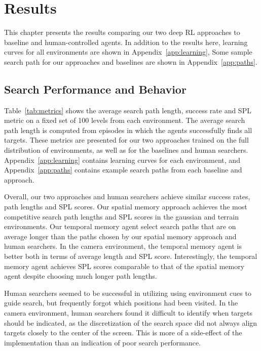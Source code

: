 \chapter{Results}
\label{cha:results}

This chapter presents the results comparing our two deep RL approaches to baseline and human-controlled agents.
In addition to the results here, learning curves for all environments are shown in Appendix~\ref{app:learning},
Some sample search path for our approaches and baselines are shown in Appendix~\ref{app:paths}.


\section{Search Performance and Behavior}

Table~\ref{tab:metrics} shows the average search path length, success rate and SPL metric on a fixed set of 100 levels from each environment.
The average search path length is computed from episodes in which the agents successfully finds all targets.
These metrics are presented for our two approaches trained on the full distribution of environments, as well as for the baselines and human searchers.
Appendix~\ref{app:learning} contains learning curves for each environment, and Appendix~\ref{app:paths} contains example search paths from each baseline and approach. 

Overall, our two approaches and human searchers achieve similar success rates, path lengths and SPL scores.
Our spatial memory approach achieves the most competitive search path lengths and SPL scores in the gaussian and terrain environments.
Our temporal memory agent select search paths that are on average longer than the paths chosen by our spatial memory approach and human searchers.
In the camera environment, the temporal memory agent is better both in terms of average length and SPL score.
Interestingly, the temporal memory agent achieves SPL scores comparable to that of the spatial memory agent despite choosing much longer path lengths.

Human searchers seemed to be successful in utilizing using environment cues to guide search, but frequently forgot which positions had been visited.
In the camera environment, human searchers found it difficult to identify when targets should be indicated,
as the discretization of the search space did not always align targets closely to the center of the screen.
This is more of a side-effect of the implementation than an indication of poor search performance.

